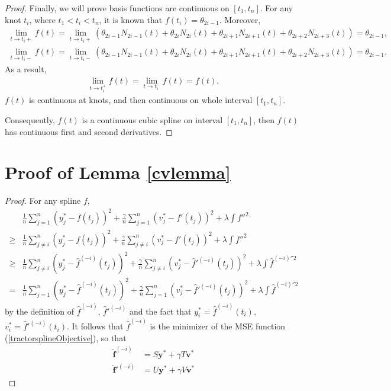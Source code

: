 \begin{proof}
Finally, we will prove basis functions are continuous on $[t_1, t_n]$. For any knot $t_i$, where $t_1< t_i <t_n$, it is known that $f(t_i)=\theta_{2i-1}$. Moreover, 
\begin{align*}
\lim\limits_{t\rightarrow t_i+} f(t) = \lim\limits_{t\rightarrow t_i+} (\theta_{2i-1}N_{2i-1}(t)+\theta_{2i}N_{2i}(t)+\theta_{2i+1}N_{2i+1}(t)+\theta_{2i+2}N_{2i+3}(t))=\theta_{2i-1},\\
\lim\limits_{t\rightarrow t_i-} f(t) = \lim\limits_{t\rightarrow t_i-} (\theta_{2i-1}N_{2i-1}(t)+\theta_{2i}N_{2i}(t)+\theta_{2i+1}N_{2i+1}(t)+\theta_{2i+2}N_{2i+3}(t))=\theta_{2i-1}.
\end{align*}
As a result, 
\begin{align*}
\lim\limits_{t\rightarrow t_i^+} f(t) =\lim\limits_{t\rightarrow t_i^-} f(t) =f(t),
\end{align*}
$f(t)$ is continuous at knots, and then continuous on whole interval $[t_1,t_n]$.

Consequently, $f(t)$ is a continuous cubic spline on interval $[t_1,t_n]$, then $f(t)$ has continuous first and second derivatives.
\end{proof}

\section{Proof of Lemma \ref{cvlemma}}
\begin{proof}
For any spline $f$, 
\begin{equation}
\begin{split}
&\frac{1}{n}\sum_{j=1}^{n}\left(y_j^*-f(t_j)\right)^2+\frac{\gamma}{n} \sum_{j=1}^{n}\left(v_j^*-f'(t_j)\right)^2+\lambda\int f''^2 \\
\geq&\frac{1}{n}\sum_{j\neq i}^{n}\left(y_j^*-f(t_j)\right)^2+\frac{\gamma}{n} \sum_{j\neq i}^{n}\left(v_j^*-f'(t_j)\right)^2+\lambda\int f''^2\\
\geq&\frac{1}{n}\sum_{j\neq i}^{n}\left(y_j^*-\hat{f}^{(-i)}(t_j)\right)^2+\frac{\gamma}{n} \sum_{j\neq i}^{n}\left(v_j^*-\hat{f}'^{(-i)}(t_j)\right)^2+\lambda\int \hat{f}^{(-i)''2}\\
=&\frac{1}{n}\sum_{j=1}^{n}\left(y_j^*-\hat{f}^{(-i)}(t_j)\right)^2+\frac{\gamma}{n} \sum_{j=1}^{n}\left(v_j^*-\hat{f}'^{(-i)}(t_j)\right)^2+\lambda\int \hat{f}^{(-i)''2}
\end{split}
\end{equation}
by the definition of $\hat{f}^{(-i)}$, $\hat{f}'^{(-i)}$ and the fact that $y_i^*=\hat{f}^{(-i)}(t_i)$, $v_i^*=\hat{f}'^{(-i)}(t_i)$. It follows that $\hat{f}^{(-i)}$ is the minimizer of the MSE function (\ref{tractorsplineObjective}), so that
\begin{align}
\mathbf{\hat{f}}^{(-i)}&=S\mathbf{y}^*+\gamma T\mathbf{v}^*\\
\mathbf{\hat{f}}'^{(-i)}&=U\mathbf{y}^*+\gamma V\mathbf{v}^*
\end{align}
\end{proof}


